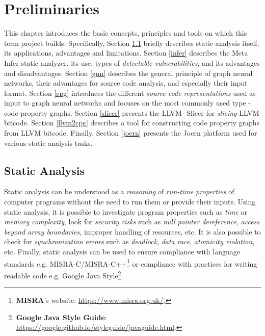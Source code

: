 \chapter{Preliminaries}
\label{preliminaries}
This chapter introduces the basic concepts, principles and tools on which this term project builds. Specifically, Section \ref{static-analysis} briefly describes static analysis itself, its applications, advantages and limitations. Section \ref{infer} describes the Meta Infer static analyzer, its use, types of \textit{detectable vulnerabilities}, and its advantages and disadvantages. Section \ref{gnn} describes the general principle of graph neural networks, their advantages for source code analysis, and especially their input format. Section \ref{cpg} introduces the different \textit{source code representations} used as input to graph neural networks and focuses on the most commonly used type - code property graphs. Section \ref{slicer} presents the LLVM- Slicer for \textit{slicing} LLVM bitcode. Section \ref{llvm2cpg} describes a tool for constructing code property graphs from LLVM bitcode. Finally, Section \ref{joern} presents the Joern platform used for various static analysis tasks.

\section{Static Analysis}
\label{static-analysis}

Static analysis \cite{bc, static-analysis-EMANUELSSON20085, testovani-herout} can be understood as a \textit{reasoning} of \textit{run-time properties} of computer programs without the need to run them or provide their inputs. Using static analysis, it is possible to investigate program properties such as \textit{time} or \textit{memory complexity}, look for \textit{security risks} such as \textit{null pointer dereference}, \textit{access beyond array boundaries}, improper handling of resources, etc. It is also possible to check for \textit{synchronization errors} such as \textit{deadlock}, \textit{data race}, \textit{atomicity violation}, etc. Finally, static analysis can be used to ensure compliance with language standards e.g. MISRA-C/MISRA-C++\footnote{\textbf{MISRA}'s website: \url{https://www.misra.org.uk/}.} or compliance with practices for writing readable code e.g. Google Java Style\footnote{\textbf{Google Java Style Guide}: \url{https://google.github.io/styleguide/javaguide.html}.}.

